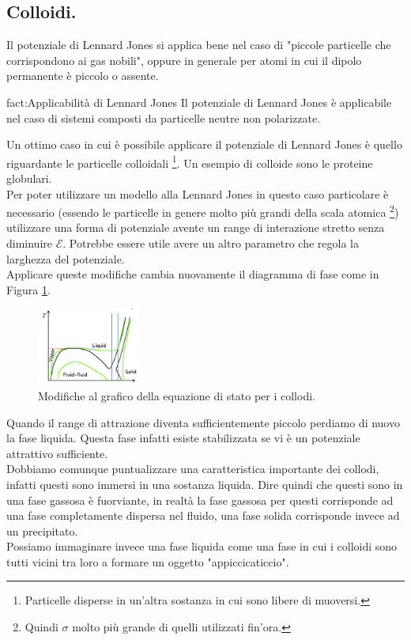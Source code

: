 \subsection{Colloidi.}
\label{subsec:Colloidi.}
Il potenziale di Lennard Jones si applica bene nel caso di "piccole particelle che corrispondono ai gas nobili", oppure in generale per atomi in cui il dipolo permanente è piccolo o assente.
\begin{fact}{fact:Applicabilità di Lennard Jones}
	Il potenziale di Lennard Jones è applicabile nel caso di sistemi composti da
	particelle neutre non polarizzate.
\end{fact}
Un ottimo caso in cui è possibile applicare il potenziale di Lennard Jones è quello riguardante le particelle colloidali \footnote{Particelle disperse in un'altra sostanza in cui sono libere di muoversi.}.
Un esempio di colloide sono le proteine globulari.\\
Per poter utilizzare un modello alla Lennard Jones in questo caso particolare è necessario (essendo le particelle in genere molto più grandi della scala atomica \footnote{Quindi $\sigma$ molto più grande di quelli utilizzati fin'ora.}) utilizzare una forma di potenziale avente un range di interazione stretto senza diminuire $\mathcal{E}$. Potrebbe essere utile avere un altro parametro che regola la larghezza del potenziale.\\
Applicare queste modifiche cambia nuovamente il diagramma di fase come in Figura \ref{fig:figures-colloidi-png}.\\
\begin{figure}[ht]
	\centering
	\includegraphics[width=0.3\textwidth]{figures/colloidi.png}
	\caption{Modifiche al grafico della equazione di stato per i collodi.}
	\label{fig:figures-colloidi-png}
\end{figure}
Quando il range di attrazione diventa sufficientemente piccolo perdiamo di nuovo la fase liquida. Questa fase infatti esiste stabilizzata se vi è un potenziale attrattivo sufficiente.\\
Dobbiamo comunque puntualizzare una caratteristica importante dei collodi, infatti questi sono immersi in una sostanza liquida. Dire quindi che questi sono in una fase gassosa è fuorviante, in realtà la fase gassosa per questi corrisponde ad una fase completamente dispersa nel fluido, una fase solida corrisponde invece ad un precipitato.\\
Possiamo immaginare invece una fase liquida come una fase in cui i colloidi sono tutti vicini tra loro a formare un oggetto "appiccicaticcio".
